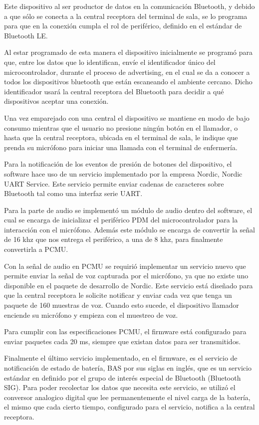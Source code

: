 Este dispositivo al ser productor de datos en la comunicación Bluetooth, y debido a que sólo se conecta a la central receptora del terminal de sala, se lo programa para que en la conexión cumpla el rol de periférico, definido en el estándar de Bluetooth LE. 

Al estar programado de esta manera el dispositivo inicialmente se programó para que, entre los datos que lo identifican, envíe el identificador único del microcontrolador, durante el proceso de advertising, en el cual se da a conocer a todos los dispositivos bluetooth que están escaneando el ambiente cercano. Dicho identificador usará la central receptora del Bluetooth para decidir a qué dispositivos aceptar una conexión.

Una vez emparejado con una central el dispositivo se mantiene en modo de bajo consumo mientras que el usuario no presione ningún botón en el llamador, o hasta que la central receptora, ubicada en el terminal de sala, le indique que prenda su micrófono para iniciar una llamada con el terminal de enfermería.

Para la notificación de los eventos de presión de botones del dispositivo, el software hace uso de un servicio implementado por la empresa Nordic, Nordic UART Service. Este servicio permite enviar cadenas de caracteres sobre Bluetooth tal como una interfaz serie UART.

Para la parte de audio se implementó un módulo de audio dentro del software, el cual se encarga de inicializar el periférico PDM del microcontrolador para la interacción con el micrófono. Además este módulo se encarga de convertir la señal de 16 khz que nos entrega el periférico, a una de 8 khz,  para finalmente convertirla a PCMU.

Con la señal de audio en PCMU se requirió implementar un servicio nuevo que permite enviar la señal de voz capturada por el micrófono, ya que no existe uno disponible en el paquete de desarrollo de Nordic. Este servicio está diseñado para que la central receptora le solicite notificar y enviar cada vez que tenga un paquete de 160 muestras de voz. Cuando esto sucede, el dispositivo llamador enciende su micrófono y empieza con el muestreo de voz.

Para cumplir con las especificaciones PCMU, el firmware está configurado para enviar paquetes cada 20 ms, siempre que existan datos para ser transmitidos.

Finalmente el último servicio implementado, en el firmware, es el servicio de notificación de estado de batería, BAS por sus siglas en inglés, que es un servicio estándar en definido por el grupo de interés especial de Bluetooth (Bluetooth SIG). Para poder recolectar los datos que necesita este servicio, se utilizó el conversor analogico digital que lee permanentemente el nivel carga de la batería, el mismo que cada cierto tiempo, configurado para el servicio, notifica a la central receptora.

